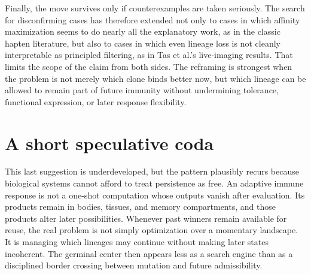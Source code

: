 \documentclass[11pt]{article}
\begin{document}
Finally, the move survives only if counterexamples are taken seriously. The search for disconfirming cases has therefore extended not only to cases in which affinity maximization seems to do nearly all the explanatory work, as in the classic hapten literature, but also to cases in which even lineage loss is not cleanly interpretable as principled filtering, as in Tas et al.'s live-imaging results. That limits the scope of the claim from both sides. The reframing is strongest when the problem is not merely which clone binds better now, but which lineage can be allowed to remain part of future immunity without undermining tolerance, functional expression, or later response flexibility.

\section{A short speculative coda}
This last suggestion is underdeveloped, but the pattern plausibly recurs because biological systems cannot afford to treat persistence as free. An adaptive immune response is not a one-shot computation whose outputs vanish after evaluation. Its products remain in bodies, tissues, and memory compartments, and those products alter later possibilities. Whenever past winners remain available for reuse, the real problem is not simply optimization over a momentary landscape. It is managing which lineages may continue without making later states incoherent. The germinal center then appears less as a search engine than as a disciplined border crossing between mutation and future admissibility.
\end{document}
